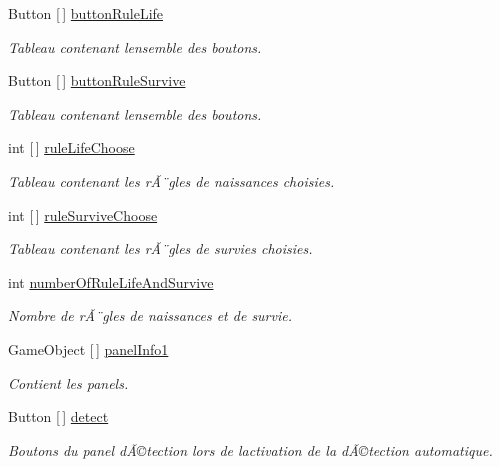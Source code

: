 \begin{DoxyCompactItemize}
Button \mbox{[}$\,$\mbox{]} \mbox{\hyperlink{class_parameters_a8f92648a7ee23e4e0b57a1a03c70615d}{button\+Rule\+Life}}
\begin{DoxyCompactList}\small\item\em Tableau contenant l\textquotesingle{}ensemble des boutons. \end{DoxyCompactList}\item 
Button \mbox{[}$\,$\mbox{]} \mbox{\hyperlink{class_parameters_a2649c58bc9e1fea496719ad146d272fe}{button\+Rule\+Survive}}
\begin{DoxyCompactList}\small\item\em Tableau contenant l\textquotesingle{}ensemble des boutons. \end{DoxyCompactList}\item 
int \mbox{[}$\,$\mbox{]} \mbox{\hyperlink{class_parameters_a69cb36fa8095b0a0b37a035e2dc21d2f}{rule\+Life\+Choose}}
\begin{DoxyCompactList}\small\item\em Tableau contenant les rÃ¨gles de naissances choisies. \end{DoxyCompactList}\item 
int \mbox{[}$\,$\mbox{]} \mbox{\hyperlink{class_parameters_abd8a872a3447aa8cf784a98cf211a7c3}{rule\+Survive\+Choose}}
\begin{DoxyCompactList}\small\item\em Tableau contenant les rÃ¨gles de survies choisies. \end{DoxyCompactList}\item 
int \mbox{\hyperlink{class_parameters_a9f5c0caa798160b623118c5c81932daa}{number\+Of\+Rule\+Life\+And\+Survive}}
\begin{DoxyCompactList}\small\item\em Nombre de rÃ¨gles de naissances et de survie. \end{DoxyCompactList}\item 
Game\+Object \mbox{[}$\,$\mbox{]} \mbox{\hyperlink{class_parameters_a21e4cca4e061b650741354680361136c}{panel\+Info1}}
\begin{DoxyCompactList}\small\item\em Contient les panels. \end{DoxyCompactList}\item 
Button \mbox{[}$\,$\mbox{]} \mbox{\hyperlink{class_parameters_a0976e55ec506eb31b8be9d56d66a98c7}{detect}}
\begin{DoxyCompactList}\small\item\em Boutons du panel dÃ©tection lors de l\textquotesingle{}activation de la dÃ©tection automatique. \end{DoxyCompactList}\item 

\end{DoxyCompactItemize}
